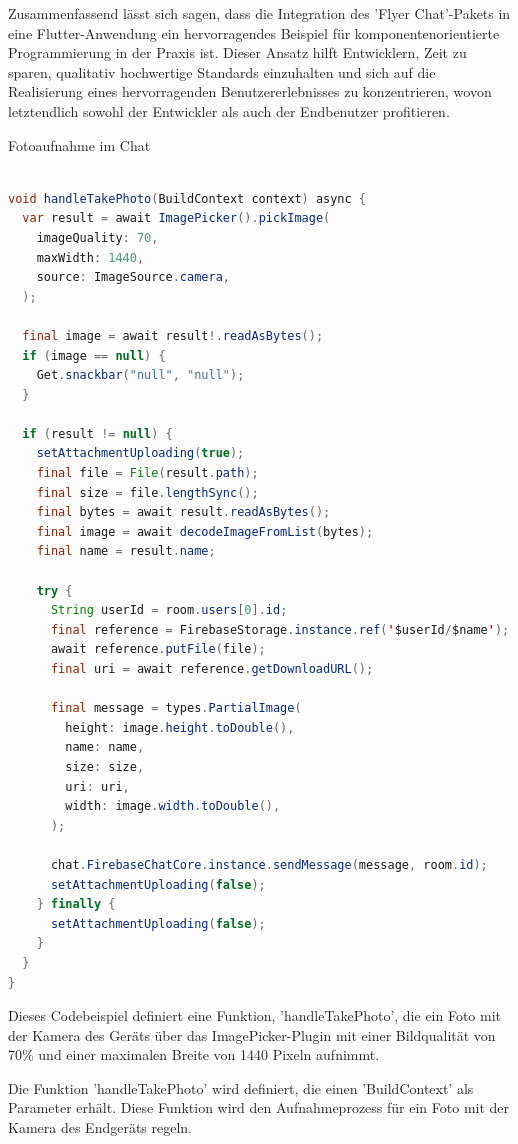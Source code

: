 Zusammenfassend lässt sich sagen, dass die Integration des 'Flyer Chat'-Pakets in eine Flutter-Anwendung ein hervorragendes Beispiel für komponentenorientierte Programmierung in der Praxis ist. Dieser Ansatz hilft Entwicklern, Zeit zu sparen, qualitativ hochwertige Standards einzuhalten und sich auf die Realisierung eines hervorragenden Benutzererlebnisses zu konzentrieren, wovon letztendlich sowohl der Entwickler als auch der Endbenutzer profitieren.


Fotoaufnahme im Chat


\begin{lstlisting}[language=Java,caption=Aufnahmeprozess für ein Foto,label=lst:foto]  

void handleTakePhoto(BuildContext context) async {
  var result = await ImagePicker().pickImage(
    imageQuality: 70,
    maxWidth: 1440,
    source: ImageSource.camera,
  );

  final image = await result!.readAsBytes();
  if (image == null) {
    Get.snackbar("null", "null");
  }

  if (result != null) {
    setAttachmentUploading(true);
    final file = File(result.path);
    final size = file.lengthSync();
    final bytes = await result.readAsBytes();
    final image = await decodeImageFromList(bytes);
    final name = result.name;

    try {
      String userId = room.users[0].id;
      final reference = FirebaseStorage.instance.ref('$userId/$name');
      await reference.putFile(file);
      final uri = await reference.getDownloadURL();

      final message = types.PartialImage(
        height: image.height.toDouble(),
        name: name,
        size: size,
        uri: uri,
        width: image.width.toDouble(),
      );

      chat.FirebaseChatCore.instance.sendMessage(message, room.id);
      setAttachmentUploading(false);
    } finally {
      setAttachmentUploading(false);
    }
  }
}

\end{lstlisting}

Dieses Codebeispiel definiert eine Funktion, 'handleTakePhoto', die ein Foto mit der Kamera des Geräts über das ImagePicker-Plugin mit einer Bildqualität von 70\% und einer maximalen Breite von 1440 Pixeln aufnimmt.

Die Funktion 'handleTakePhoto' wird definiert, die einen 'BuildContext' als Parameter erhält. Diese Funktion wird den Aufnahmeprozess für ein Foto mit der Kamera des Endgeräts regeln.

